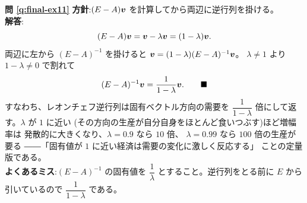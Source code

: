 \bigskip
\noindent\textbf{問 \ref{q:final-ex11}}\quad
\textbf{方針}:$(E - A)\bm{v}$ を計算してから両辺に逆行列を掛ける。\\
\textbf{解答}:
\[
(E - A)\bm{v} = \bm{v} - \lambda\bm{v} = (1 - \lambda)\bm{v}.
\]
両辺に左から $(E - A)^{-1}$ を掛けると
$\bm{v} = (1 - \lambda)(E - A)^{-1}\bm{v}$。
$\lambda \neq 1$ より $1 - \lambda \neq 0$ で割れて
\[
(E - A)^{-1}\bm{v} = \frac{1}{1 - \lambda}\bm{v}. \qquad\blacksquare
\]
すなわち、レオンチェフ逆行列は固有ベクトル方向の需要を
$\dfrac{1}{1 - \lambda}$ 倍にして返す。$\lambda$ が $1$ に近い
(その方向の生産が自分自身をほとんど食いつぶす)ほど増幅率は
発散的に大きくなり、$\lambda = 0.9$ なら $10$ 倍、
$\lambda = 0.99$ なら $100$ 倍の生産が要る
――「固有値が $1$ に近い経済は需要の変化に激しく反応する」
ことの定量版である。\\
\textbf{よくあるミス}:$(E - A)^{-1}$ の固有値を
$\dfrac{1}{\lambda}$ とすること。逆行列をとる前に
$E$ から引いているので $\dfrac{1}{1 - \lambda}$ である。
